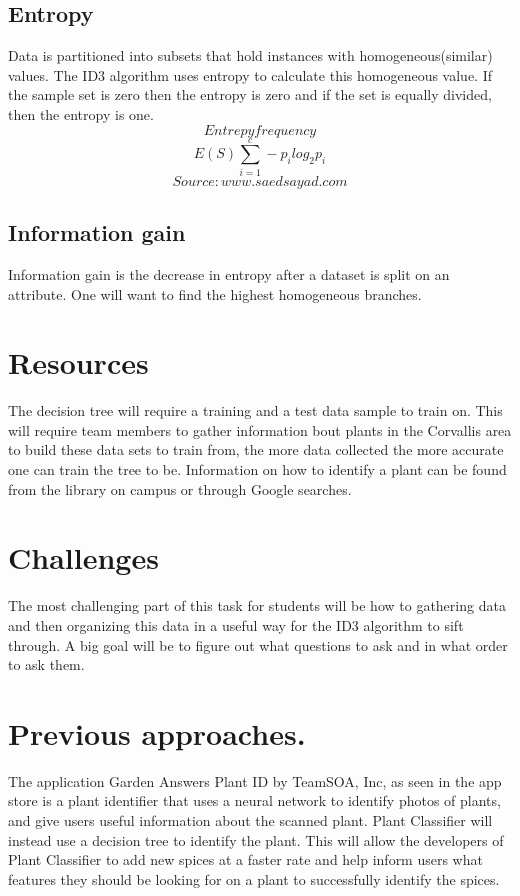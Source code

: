 \documentclass[a4paper]{article}
\begin{document}
\subsection{Entropy}
Data is partitioned into subsets that hold instances with homogeneous(similar) values. The ID3 algorithm uses entropy to calculate this homogeneous value. If the sample set is zero then the entropy is zero and if the set is equally divided, then the entropy is one. $$Entrepy frequency $$ $$E(S)\sum_{i=1}^{c} -p_{i} log_{2} p_{i}$$ $$Source: www.saedsayad.com$$
\subsection{Information gain}
Information gain is the decrease in entropy after a dataset is split on an attribute. One will want to find the highest homogeneous branches.
\section{Resources}
The decision tree will require a training and a test data sample to train on. This will require team members to gather information bout plants in the Corvallis area to build these data sets to train from, the more data collected the more accurate one can train the tree to be. Information on how to identify a plant can be found from the library on campus or through Google searches.
\section{Challenges}
The most challenging part of this task for students will be how to gathering data and then organizing this data in a useful way for the ID3 algorithm to sift through. A big goal will be to figure out what questions to ask and in what order to ask them.
\section{Previous approaches.}
The application Garden Answers Plant ID by TeamSOA, Inc, as seen in the app store is a plant identifier that uses a neural network to identify photos of plants, and give users useful information about the scanned plant. Plant Classifier will instead use a decision tree to identify the plant. This will allow the developers of Plant Classifier to add new spices at a faster rate and help inform users what features they should be looking for on a plant to successfully identify the spices.
\end{document}
